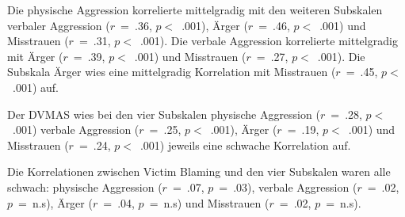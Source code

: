 Die physische Aggression korrelierte mittelgradig mit den weiteren Subskalen verbaler Aggression ($r$~=~.36, $p<$~.001), Ärger ($r$~=~.46, $p<$~.001) und Misstrauen ($r$~=~.31, $p<$~.001).
Die verbale Aggression korrelierte mittelgradig mit Ärger ($r$~=~.39, $p<$~.001) und Misstrauen ($r$~=~.27, $p<$~.001).
Die Subskala Ärger wies eine mittelgradig Korrelation mit Misstrauen ($r$~=~.45, $p<$~.001) auf.

Der DVMAS wies bei den vier Subskalen physische Aggression ($r$~=~.28, $p<$~.001) verbale Aggression ($r$~=~.25, $p<$~.001), Ärger ($r$~=~.19, $p<$~.001) und Misstrauen ($r$~=~.24, $p<$~.001) jeweils eine schwache Korrelation auf.

Die Korrelationen zwischen Victim Blaming und den vier Subskalen waren alle schwach: physische Aggression ($r$~=~.07, $p$~=~.03), verbale Aggression ($r$~=~.02, $p$~=~n.s), Ärger ($r$~=~.04, $p$~=~n.s) und Misstrauen ($r$~=~.02, $p$~=~n.s).



